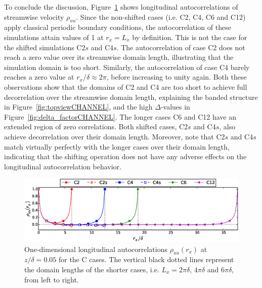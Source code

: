 		To conclude the discussion, Figure~\ref{fig:correlationsC} shows longitudinal autocorrelations of streamwise velocity $\rho_{uu}$.
		Since the non-shifted cases (i.e. C2, C4, C6 and C12) apply classical periodic boundary conditions, the autocorrelation of these
		simulations attain values of 1 at $r_x = L_x$ by definition. This is not the case for the shifted simulations C2$s$ and C4$s$. The
		autocorrelation of case C2 does not reach a zero value over its streamwise domain length, illustrating that the simulation domain is
		too short. Similarly, the autocorrelation of case C4 barely reaches a zero value at $r_x/\delta \approx 2 \pi$, before increasing to unity again. Both these observations show that the domains of C2 and C4 are too short to achieve full decorrelation over the streamwise domain length, explaining the banded structure in Figure~\ref{fig:topviewCHANNEL}, and the high $\Delta$-values in Figure~\ref{fig:delta_factorCHANNEL}. The longer cases C6 and C12 have an extended region of zero correlations. Both shifted cases, C2$s$ and C4$s$, also achieve decorrelation over their domain length. Moreover, note that C2$s$ and C4$s$ match virtually perfectly with the longer cases over their domain length, indicating that the shifting operation does not have any adverse effects on the longitudinal autocorrelation behavior.
		
		\begin{figure}
				\centering
			\includegraphics[width=\textwidth,trim= 0cm 0.2cm 0cm 0.cm,clip]{chapters/turbulent_inflow/spbc/figure6}
			\caption{One-dimensional longitudinal autocorrelations $\rho_{uu}(r_x)$ at $z/\delta = 0.05$ for the C cases. The vertical black dotted lines represent the domain lengths of the shorter cases, i.e. $L_x = 2\pi\delta$, $4\pi\delta$ and $6\pi\delta$, from left to right.}
			\label{fig:correlationsC}
		\end{figure}
		
		
